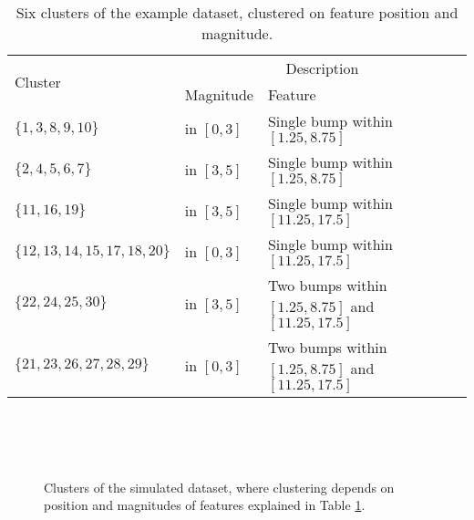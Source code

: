 \documentclass[../main.tex]{subfiles}
\begin{document}
 \begin{table}[h!]
  \begin{center}
    \begin{tabular}{|l|l|p{6.7cm}|}
    \hline
     \multirow{2}{4em}{Cluster} & \multicolumn{2}{c|}{Description} \\
     & Magnitude & Feature \\ \hline 
      $\{1,3,8,9,10\}$ & in $[0,3]$& Single bump within $[1.25,8.75]$ \\
      $\{2,4,5,6,7\}$ & in $[3,5]$ & Single bump within $[1.25,8.75]$\\
      $\{11,16,19\}$ &in $[3,5]$ & Single bump within $[11.25,17.5]$ \\
      $\{12,13,14,15,17,18,20\}$ &in $[0,3]$& Single bump within $[11.25,17.5]$ \\
      $\{22,24,25,30\}$ &in $[3,5]$ & Two bumps within $[1.25,8.75]$ and $[11.25,17.5]$ \\
      $\{21,23,26,27,28,29\}$&in $[0,3]$ & Two bumps within $[1.25,8.75]$ and $[11.25,17.5]$ \\ 
      \hline
       \end{tabular}
  \end{center}
     \caption{Six clusters of the example dataset, clustered on feature position and magnitude.}
      \label{table:ExCluster2}
\end{table} 

  \begin{figure}[t!]
   \hrulefill
   \begin{center} 
     \quad
      \\ 
      
          \quad
      \\
       
          \quad
       \\
    \end{center}     
    \caption{Clusters of the simulated dataset, where clustering depends on position and magnitudes of features explained in Table \ref{table:ExCluster2}. }
    \label{fig:Plot_ExCluster}
    \hrulefill
    \end{figure}
\end{document}
